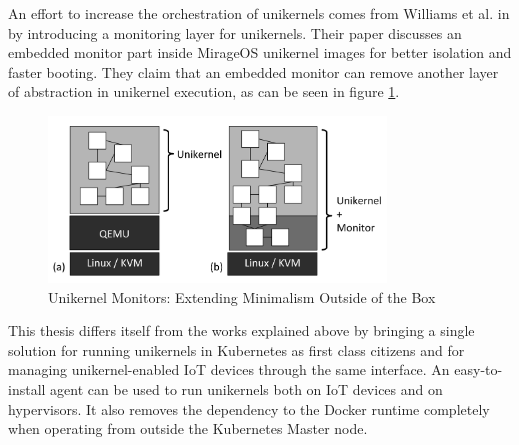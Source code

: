 An effort to increase the orchestration of unikernels comes from Williams et al. in \cite{Williams2016} by introducing a monitoring layer for unikernels. Their paper discusses an embedded monitor part inside MirageOS unikernel images for better isolation and faster booting. They claim that an embedded monitor can remove another layer of abstraction in unikernel execution, as can be seen in figure \ref{fig:unikernel-monitor}.

\begin{figure}[htpb]
    \centering
    \includegraphics[width=0.8\textwidth]{figures/monitors.png}
    \caption{Unikernel Monitors: Extending Minimalism Outside of the Box \cite{Williams2016} } \label{fig:unikernel-monitor}
  \end{figure}



This thesis differs itself from the works explained above by bringing a single solution for running unikernels in Kubernetes as first class citizens and for managing unikernel-enabled IoT devices through the same interface. An easy-to-install agent can be used to run unikernels both on IoT devices and on hypervisors. It also removes the dependency to the Docker runtime completely when operating from outside the Kubernetes Master node.